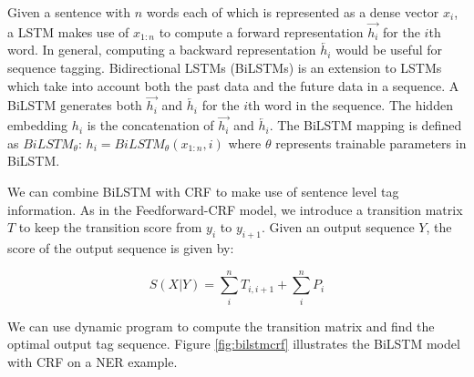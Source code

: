\documentclass{sfuthesis}
\begin{document}
Given a sentence with $n$ words each of which is represented as a dense vector $x_i$, a LSTM makes use of $x_{1:n}$ to compute a forward representation $\overrightarrow {h_{i}}$ for the $i$th word. In general, computing a backward representation $\overleftarrow {h_{i}}$ would be useful for sequence tagging. Bidirectional LSTMs (BiLSTMs) is an extension to LSTMs which take into account both the past data and the future data in a sequence. A BiLSTM generates both $\overrightarrow {h_{i}}$ and $\overleftarrow {h_{i}}$ for the $i$th word in the sequence. The hidden embedding $h_{i}$ is the concatenation of $\overrightarrow {h_{i}}$ and $\overleftarrow {h_{i}}$. The BiLSTM mapping is defined as $BiLSTM_{\theta}$:
$h_{i} = BiLSTM_{\theta}\left(x_{1:n}, i\right)$ where $\theta$ represents trainable parameters in BiLSTM.

 We can combine BiLSTM with CRF to make use of sentence level tag information. As in the Feedforward-CRF model, we introduce a transition matrix $T$ to keep the transition score from $y_{i}$ to $y_{i+1}$. Given an output sequence $Y$, the score of the output sequence is given by:

\begin{equation}
S\left( X|Y\right)=\sum _{i}^{n}T_{i,i+1}+\sum _{i}^{n}P_{i}
\end{equation}

We can use dynamic program to compute the transition matrix and find the optimal output tag sequence. Figure \ref{fig:bilstmcrf} illustrates the BiLSTM model with CRF on a NER example.
\end{document}

